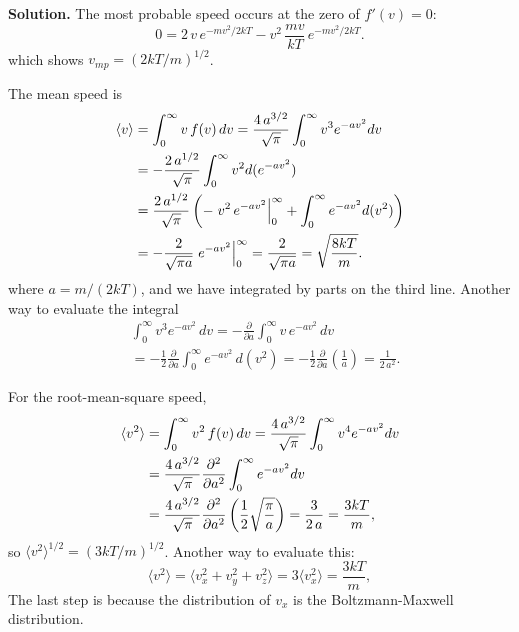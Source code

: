 \documentclass[twocolumn, 10pt]{article}
\numberwithin{equation}{section}
\newenvironment{solution}
{\par\medskip
  \textbf{Solution. }\ignorespaces}
{\medskip}
\begin{document}
\begin{solution}
The most probable speed
occurs at the zero of $f'(v) = 0$:
$$
0 =
  2 \, v \, e^{-mv^2/2kT}
  -v^2 \, \frac{mv}{kT} \, e^{-mv^2/2kT}.
$$
which shows $v_{mp} = (2kT/m)^{1/2}$.

The mean speed is
\begin{align}
  \langle v \rangle
  &=
  \int_0^\infty v \, f(v) \, dv
  =
  \frac{4 \, a^{3/2}}{\sqrt\pi}
  \int_0^\infty
    v^3 e^{-av^2} dv
  \notag
  \\
  &=
  -\frac{2 \, a^{1/2}}{\sqrt\pi}
  \int_0^\infty
    v^2 d(e^{-av^2})
  \notag
  \\
  &=
  \frac{2 \, a^{1/2}}{\sqrt\pi}
  \left(
  -\left. v^2 \, e^{-av^2} \right|_0^\infty
  +
  \int_0^\infty
    e^{-av^2} d(v^2)
  \right)
  \notag
  \\
  &=
  -\frac{2}{\sqrt{\pi a}}
  \left.  e^{-av^2}\right|_0^\infty
  =
  \frac{2}{\sqrt{\pi a}}
  =
    \sqrt{ \frac{8kT}{m} }
  .
  \label{eq:absv_ave}
\end{align}
where $a = m/(2kT)$,
and we have integrated by parts
on the third line.
%
Another way to evaluate the integral
%
\begin{align*}
  &\int_0^\infty
    v^3 e^{-av^2} \, dv
  =
  -\frac{\partial}{\partial a}
  \int_0^\infty
    v \, e^{-av^2} \, dv
  \\
  &=
  -\frac{1}{2}
  \frac{\partial}{\partial a}
  \int_0^\infty
    e^{-av^2} \, d(v^2)
  =
  -\frac{1}{2}
  \frac{\partial}{\partial a}
    \left(  \frac{1}{a} \right)
  =\frac{1}{2 \, a^2}.
\end{align*}

For the root-mean-square speed,
\begin{align}
  \langle v^2 \rangle
  &=
  \int_0^\infty v^2 \, f(v) \, dv
  =
  \frac{4 \, a^{3/2}}{\sqrt\pi}
  \int_0^\infty
    v^4 e^{-av^2} dv
  \notag \\
  &=
  \frac{4 \, a^{3/2}}{\sqrt\pi}
    \frac{ \partial^2 } { \partial a^2 }
  \int_0^\infty
    e^{-av^2} d v
  \notag \\
  &=
  \frac{4 \, a^{3/2}}{\sqrt\pi}
    \frac{ \partial^2 } { \partial a^2 }
    \left( \frac{1}{2} \sqrt{ \frac{ \pi } { a } } \right)
  =
  \frac{3}{2 \, a}
  =
  \frac{3kT}{m}
  ,
  \label{eq:v2_ave}
\end{align}
so $\langle v^2 \rangle^{1/2} = (3kT/m)^{1/2}$.
%
Another way to evaluate this:
$$
\langle v^2 \rangle
=
\langle v_x^2 + v_y^2 + v_z^2 \rangle
=
3 \langle v_x^2 \rangle
=
\frac{ 3 k T } { m },
$$
The last step is because
the distribution of $v_x$
is the Boltzmann-Maxwell distribution.


\end{solution}
\end{document}
